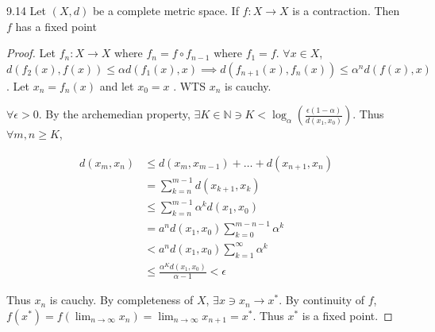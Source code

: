 \documentclass{article}
\newcommand{\N}{\mathbb{N}}
\begin{document}
\begin{claim}{9.14}\label{Claim 9.14.}
    Let $(X, d)$ be a complete metric space. If $f: X \to X$ is a contraction. Then $f$ has a fixed point   
\end{claim}
\begin{proof}
    Let $f_n: X \to X$ where $f_n = f \circ f_{n-1}$ where $f_1 = f$.   
    $\forall x \in X$, $d(f_2(x), f(x)) \leq \alpha d(f_1(x), x) \implies d(f_{n + 1}(x), f_n(x)) \leq \alpha^n d(f(x), x)$. Let $x_n = f_n(x)$ and let $x_0 = x$ . WTS $x_n$ is cauchy. 
    
    
    $\forall \epsilon > 0$. By the archemedian property, $\exists K \in \N \ni K < \log_{\alpha}\left(\frac{\epsilon (1- \alpha)}{d(x_1, x_0)}\right)$. Thus $\forall m, n \geq K$, 
    
    
    \begin{align*}
        d(x_m, x_n) &\leq d(x_m, x_{m - 1}) + \dots + d(x_{n + 1}, x_n) \\
        &= \sum_{k = n}^{m - 1}d(x_{k + 1}, x_k) \\
        &\leq \sum_{k = n}^{m - 1}\alpha^k d(x_{1}, x_0) \\
        &= a^n d(x_{1}, x_0) \sum_{k = 0}^{m - n - 1}\alpha^k \\
        &< a^n d(x_{1}, x_0) \sum_{k = 1}^{\infty}\alpha^k \\
        &\leq \frac{\alpha^K d(x_1, x_0)}{\alpha - 1} < \epsilon
    \end{align*}

    Thus $x_n$ is cauchy. By completeness of $X$, $\exists x \ni x_n \to x^*$. By continuity of $f$, $f(x^*) = f(\lim_{n \to \infty} x_n) = \lim_{n \to \infty} x_{n + 1} = x^*$. Thus $x^*$ is a fixed point.    
\end{proof}

\bigskip
\end{document}
